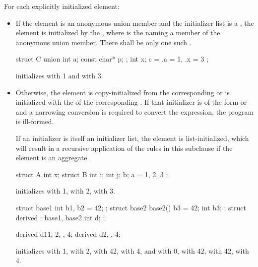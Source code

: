 \pnum
For each explicitly initialized element:
\begin{itemize}
\item
If the element is an anonymous union member and
the initializer list is a ,
the element is initialized by the
 \tcode{\{ }\tcode{ \}},
where  is the 
naming a member of the anonymous union member.
There shall be only one such .
\begin{example}
\begin{codeblock}
struct C {
  union {
    int a;
    const char* p;
  };
  int x;
} c = { .a = 1, .x = 3 };
\end{codeblock}
initializes  with 1 and  with 3.
\end{example}
\item
Otherwise, the element is copy-initialized
from the corresponding 
or is initialized with the 
of the corresponding .
If that initializer is of the form
 or
\tcode{= }
and
a narrowing conversion is required
to convert the expression, the program is ill-formed.
\begin{note}
If an initializer is itself an initializer list,
the element is list-initialized, which will result in a recursive application
of the rules in this subclause if the element is an aggregate.
\end{note}
\begin{example}
\begin{codeblock}
struct A {
  int x;
  struct B {
    int i;
    int j;
  } b;
} a = { 1, { 2, 3 } };
\end{codeblock}
initializes
with 1,
with 2,
with 3.

\begin{codeblock}
struct base1 { int b1, b2 = 42; };
struct base2 {
  base2() {
    b3 = 42;
  }
  int b3;
};
struct derived : base1, base2 {
  int d;
};

derived d1{{1, 2}, {}, 4};
derived d2{{}, {}, 4};
\end{codeblock}
initializes
 with 1,
 with 2,
 with 42,
 with 4, and
 with 0,
 with 42,
 with 42,
 with 4.
\end{example}
\end{itemize}

